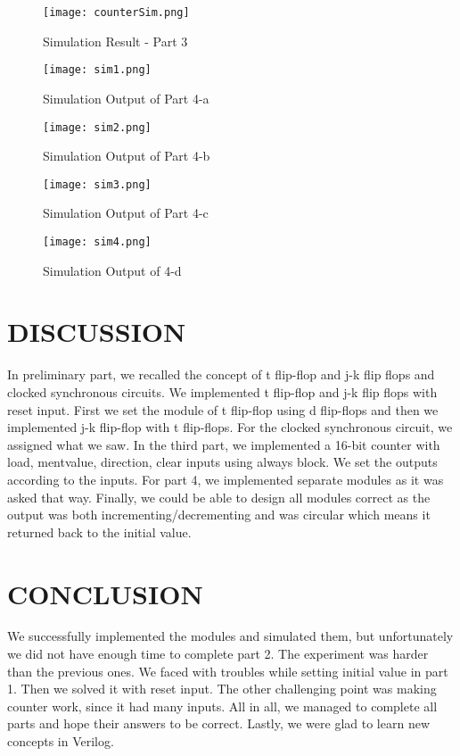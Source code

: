 \documentclass[pdftex,12pt,a4paper]{article}
\begin{document}
\begin{figure}[ht]
	\centering
	\texttt{[image: counterSim.png]}
	\caption{Simulation Result - Part 3}
	\label{fig1}
\end{figure}

\begin{figure}[ht]
	\centering
	\texttt{[image: sim1.png]}
	\caption{Simulation Output of Part 4-a}
	\label{fig1}
\end{figure}

\begin{figure}[ht]
	\centering
	\texttt{[image: sim2.png]}
	\caption{Simulation Output of Part 4-b}
	\label{fig1}
\end{figure}

\begin{figure}[ht]
	\centering
	\texttt{[image: sim3.png]}
	\caption{Simulation Output of Part 4-c}
	\label{fig1}
\end{figure}

\begin{figure}[ht]
	\centering
	\texttt{[image: sim4.png]}
	\caption{Simulation Output of 4-d}
	\label{fig1}
\end{figure}

\newpage
\section{DISCUSSION }
In preliminary part, we recalled the concept of t flip-flop and j-k flip flops and clocked synchronous circuits. We implemented t flip-flop and j-k flip flops with reset input. First we set the module of t flip-flop using d flip-flops and then we implemented j-k flip-flop with t flip-flops. For the clocked synchronous circuit, we assigned what we saw.
In the third part, we implemented a 16-bit counter with load, mentvalue, direction, clear inputs using always block. We set the outputs according to the inputs. For part 4, we implemented separate modules as it was asked that way. Finally, we could be able to design all modules correct as the output was both incrementing/decrementing and was circular which means it returned back to the initial value.

\section{CONCLUSION}
We successfully implemented the modules and simulated them, but unfortunately we did not have enough time to complete part 2. The experiment was harder than the previous ones. We faced with troubles while setting initial value in part 1. Then we solved it with reset input. The other challenging point was making counter work, since it had many inputs. All in all, we managed to complete all parts and hope their answers to be correct. Lastly, we were glad to learn new concepts in Verilog.



\nocite{ref1}
\nocite{overleaf}
\end{document}
